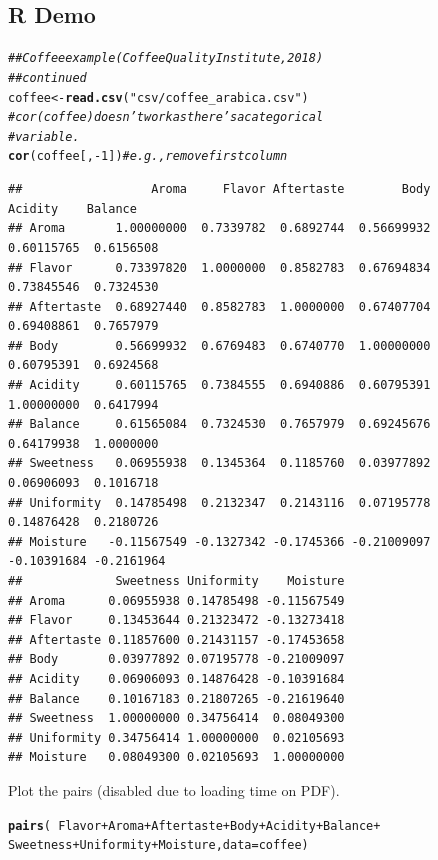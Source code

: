 \documentclass[oneside]{book}\usepackage[]{graphicx}\usepackage[dvipsnames,table,xcdraw]{xcolor}
\makeatletter
\newcommand{\hlnum}[1]{\textcolor[rgb]{0.686,0.059,0.569}{#1}}%
\newcommand{\hlstr}[1]{\textcolor[rgb]{0.192,0.494,0.8}{#1}}%
\newcommand{\hlcom}[1]{\textcolor[rgb]{0.678,0.584,0.686}{\textit{#1}}}%
\newcommand{\hlopt}[1]{\textcolor[rgb]{0,0,0}{#1}}%
\newcommand{\hlstd}[1]{\textcolor[rgb]{0.345,0.345,0.345}{#1}}%
\newcommand{\hlkwb}[1]{\textcolor[rgb]{0.69,0.353,0.396}{#1}}%
\newcommand{\hlkwc}[1]{\textcolor[rgb]{0.333,0.667,0.333}{#1}}%
\newcommand{\hlkwd}[1]{\textcolor[rgb]{0.737,0.353,0.396}{\textbf{#1}}}%
\newenvironment{kframe}{%
 \def\at@end@of@kframe{}%
 \ifinner\ifhmode%
  \def\at@end@of@kframe{\end{minipage}}%
  \begin{minipage}{\columnwidth}%
 \fi\fi%
 \def\FrameCommand##1{\hskip\@totalleftmargin \hskip-\fboxsep
 \colorbox{shadecolor}{##1}\hskip-\fboxsep
     \hskip-\linewidth \hskip-\@totalleftmargin \hskip\columnwidth}%
 \MakeFramed {\advance\hsize-\width
   \@totalleftmargin\z@ \linewidth\hsize
   \@setminipage}}%
 {\par\unskip\endMakeFramed%
 \at@end@of@kframe}
\newenvironment{knitrout}{}{} %
\makeatother
\begin{document}
\subsection{R Demo}
\begin{knitrout}
\color{fgcolor}\begin{kframe}
\begin{alltt}
\hlcom{## Coffee example (Coffee Quality Institute, 2018)}
\hlcom{## continued}
\hlstd{coffee} \hlkwb{<-} \hlkwd{read.csv}\hlstd{(}\hlstr{"csv/coffee_arabica.csv"}\hlstd{)}
\hlcom{# cor(coffee) doesn't work as there's a categorical}
\hlcom{# variable.}
\hlkwd{cor}\hlstd{(coffee[,} \hlopt{-}\hlnum{1}\hlstd{])}  \hlcom{# e.g., remove first column}
\end{alltt}
\begin{verbatim}
##                  Aroma     Flavor Aftertaste        Body     Acidity    Balance
## Aroma       1.00000000  0.7339782  0.6892744  0.56699932  0.60115765  0.6156508
## Flavor      0.73397820  1.0000000  0.8582783  0.67694834  0.73845546  0.7324530
## Aftertaste  0.68927440  0.8582783  1.0000000  0.67407704  0.69408861  0.7657979
## Body        0.56699932  0.6769483  0.6740770  1.00000000  0.60795391  0.6924568
## Acidity     0.60115765  0.7384555  0.6940886  0.60795391  1.00000000  0.6417994
## Balance     0.61565084  0.7324530  0.7657979  0.69245676  0.64179938  1.0000000
## Sweetness   0.06955938  0.1345364  0.1185760  0.03977892  0.06906093  0.1016718
## Uniformity  0.14785498  0.2132347  0.2143116  0.07195778  0.14876428  0.2180726
## Moisture   -0.11567549 -0.1327342 -0.1745366 -0.21009097 -0.10391684 -0.2161964
##             Sweetness Uniformity    Moisture
## Aroma      0.06955938 0.14785498 -0.11567549
## Flavor     0.13453644 0.21323472 -0.13273418
## Aftertaste 0.11857600 0.21431157 -0.17453658
## Body       0.03977892 0.07195778 -0.21009097
## Acidity    0.06906093 0.14876428 -0.10391684
## Balance    0.10167183 0.21807265 -0.21619640
## Sweetness  1.00000000 0.34756414  0.08049300
## Uniformity 0.34756414 1.00000000  0.02105693
## Moisture   0.08049300 0.02105693  1.00000000
\end{verbatim}
\end{kframe}
\end{knitrout}

Plot the pairs (disabled due to loading time on PDF).

\begin{knitrout}
\color{fgcolor}\begin{kframe}
\begin{alltt}
\hlkwd{pairs}\hlstd{(}\hlopt{~}\hlstd{Flavor} \hlopt{+} \hlstd{Aroma} \hlopt{+} \hlstd{Aftertaste} \hlopt{+} \hlstd{Body} \hlopt{+} \hlstd{Acidity} \hlopt{+} \hlstd{Balance} \hlopt{+}
  \hlstd{Sweetness} \hlopt{+} \hlstd{Uniformity} \hlopt{+} \hlstd{Moisture,} \hlkwc{data} \hlstd{= coffee)}
\end{alltt}
\end{kframe}
\end{knitrout}
\end{document}
